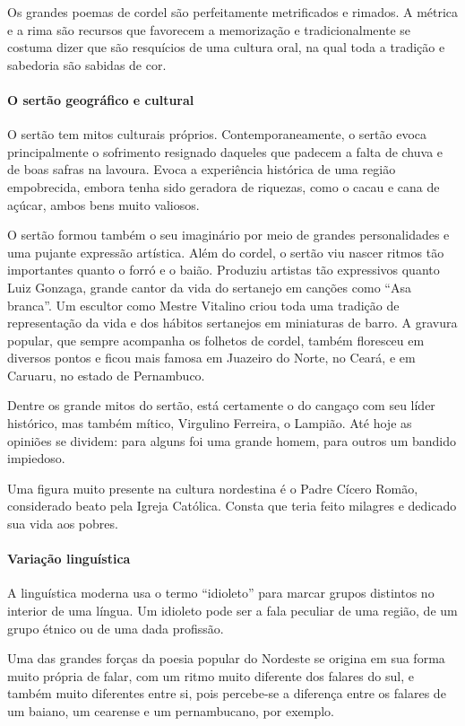 \documentclass[11pt]{extarticle}
\begin{document}
Os grandes poemas de cordel são perfeitamente metrificados e rimados. A métrica
e a rima são recursos que favorecem a memorização e tradicionalmente se costuma
dizer que são resquícios de uma cultura oral, na qual toda a tradição e
sabedoria são sabidas de cor.  


\paragraph{O sertão geográfico e cultural}

O sertão tem mitos culturais próprios. Contemporaneamente, o sertão evoca
principalmente o sofrimento resignado daqueles que padecem a falta de chuva e
de boas safras na lavoura. Evoca a experiência histórica de uma região
empobrecida, embora tenha sido geradora de riquezas, como o cacau e cana de
açúcar, ambos bens muito valiosos. 

O sertão formou também o seu imaginário por meio de grandes personalidades e
uma pujante expressão artística. Além do cordel, o sertão viu nascer ritmos tão
importantes quanto o forró e o baião. Produziu artistas tão expressivos quanto
Luiz Gonzaga, grande cantor da vida do sertanejo em canções como “Asa branca”.
Um escultor como Mestre Vitalino criou toda uma tradição de representação da
vida e dos hábitos sertanejos em miniaturas de barro. A gravura popular, que
sempre acompanha os folhetos de cordel, também floresceu em diversos pontos e
ficou mais famosa em Juazeiro do Norte, no Ceará, e em Caruaru, no estado de
Pernambuco. 

Dentre os grande mitos do sertão, está certamente o do cangaço com seu líder
histórico, mas também mítico, Virgulino Ferreira, o Lampião. Até hoje as
opiniões se dividem: para alguns foi uma grande homem, para outros um bandido
impiedoso. 

Uma figura muito presente na cultura nordestina é o Padre Cícero Romão,
considerado beato pela Igreja Católica. Consta que teria feito milagres e
dedicado sua vida aos pobres. 

\paragraph{Variação linguística}

A linguística moderna usa o termo “idioleto” para marcar grupos distintos no
interior de uma língua. Um idioleto pode ser a fala peculiar de uma região, de
um grupo étnico ou de uma dada profissão. 

Uma das grandes forças da poesia popular do Nordeste se origina em sua forma
muito própria de falar, com um ritmo muito diferente dos falares do sul, e
também muito diferentes entre si, pois percebe-se a diferença entre os falares
de um baiano, um cearense e um pernambucano, por exemplo.
\end{document}
